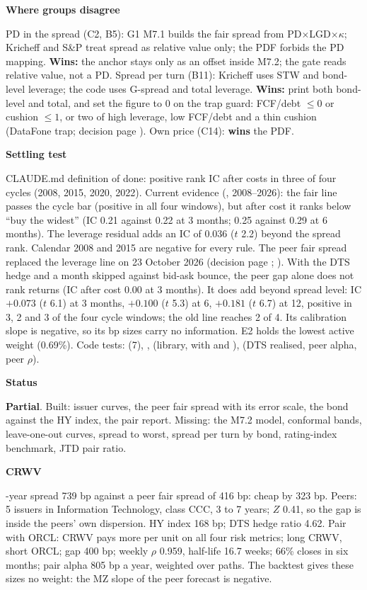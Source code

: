 \documentclass[11pt]{article}
\newcommand{\stpartial}{\textcolor{warn}{\textbf{Partial}}}
\newcommand{\fld}[1]{\par\medskip\noindent\textbf{\textcolor{steel}{#1}}\par\nopagebreak}
\begin{document}
\fld{Where groups disagree} PD in the spread (C2, B5): G1 M7.1 builds the fair spread from PD$\times$LGD$\times\kappa$; Kricheff and S\&P treat spread as relative value only; the PDF forbids the PD mapping. \textbf{Wins:} the anchor stays only as an offset inside M7.2; the gate reads relative value, not a PD. Spread per turn (B11): Kricheff uses STW and bond-level leverage; the code uses G-spread and total leverage. \textbf{Wins:} print both bond-level and total, and set the figure to 0 on the trap guard: FCF/debt $\le 0$ or cushion $\le 1$, or two of high leverage, low FCF/debt and a thin cushion (DataFone trap; decision page ). Own price (C14): \textbf{wins} the PDF.

\fld{Settling test} CLAUDE.md definition of done: positive rank IC after costs in three of four cycles (2008, 2015, 2020, 2022). Current evidence (, 2008--2026): the fair line passes the cycle bar (positive in all four windows), but after cost it ranks below ``buy the widest'' (IC 0.21 against 0.22 at 3 months; 0.25 against 0.29 at 6 months). The leverage residual adds an IC of 0.036 ($t$ 2.2) beyond the spread rank. Calendar 2008 and 2015 are negative for every rule. The peer fair spread replaced the leverage line on 23 October 2026 (decision page ; ). With the DTS hedge and a month skipped against bid-ask bounce, the peer gap alone does not rank returns (IC after cost 0.00 at 3 months). It does add beyond spread level: IC $+0.073$ ($t$ 6.1) at 3 months, $+0.100$ ($t$ 5.3) at 6, $+0.181$ ($t$ 6.7) at 12, positive in 3, 2 and 3 of the four cycle windows; the old line reaches 2 of 4. Its calibration slope is negative, so its bp sizes carry no information. E2 holds the lowest active weight (0.69\%). Code tests:  (7), ,  (library, with  and ),  (DTS realised, peer alpha, peer $\rho$).

\fld{Status} \stpartial. Built: issuer curves, the peer fair spread with its error scale, the bond against the HY index, the pair report. Missing: the M7.2 model, conformal bands, leave-one-out curves, spread to worst, spread per turn by bond, rating-index benchmark, JTD pair ratio.

\fld{CRWV} 5-year spread 739 bp against a peer fair spread of 416 bp: cheap by 323 bp. Peers: 5 issuers in Information Technology, class CCC, 3 to 7 years; $Z$ 0.41, so the gap is inside the peers' own dispersion. HY index 168 bp; DTS hedge ratio 4.62. Pair with ORCL: CRWV pays more per unit on all four risk metrics; long CRWV, short ORCL; gap 400 bp; weekly $\rho$ 0.959, half-life 16.7 weeks; 66\% closes in six months; pair alpha 805 bp a year, weighted over paths. The backtest gives these sizes no weight: the MZ slope of the peer forecast is negative.
\end{document}
